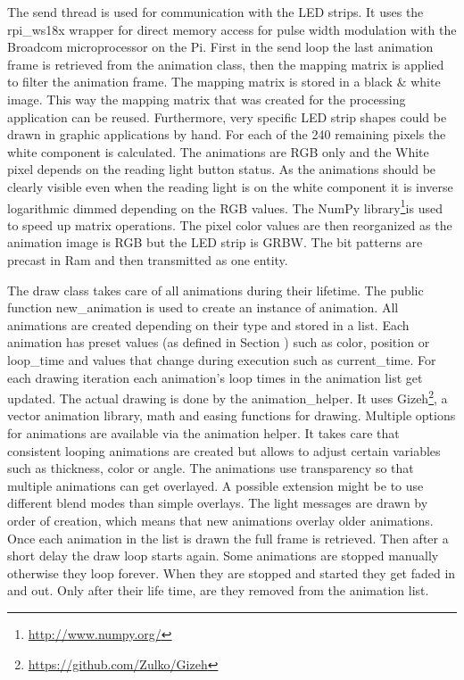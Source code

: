 The send thread is used for communication with the LED strips. It uses the rpi\_ws18x wrapper for direct memory access for pulse width modulation with the Broadcom microprocessor on the Pi. First in the send loop the last animation frame is retrieved from the animation class, then the mapping matrix is applied to filter the animation frame. The mapping matrix is stored in a black \& white image. This way the mapping matrix that was created for the processing application can be reused. Furthermore, very specific LED strip shapes could be drawn in graphic applications by hand. For each of the 240 remaining pixels the white component is calculated. The animations are RGB only and the White pixel depends on the reading light button status. As the animations should be clearly visible even when the reading light is on the white component it is inverse logarithmic dimmed depending on the RGB values. The NumPy library\footnote{\url{http://www.numpy.org/}}is used to speed up matrix operations. The pixel color values are then reorganized as the animation image is RGB but the LED strip is GRBW. The bit patterns are precast in Ram and then transmitted as one entity. 

The draw class takes care of all animations during their lifetime. The public function new\_animation is used to create an instance of animation. All animations are created depending on their type and stored in a list. Each animation has preset values (as defined in Section \emph{}) such as color, position or loop\_time and values that change during execution such as current\_time. For each drawing iteration each animation's loop times in the animation list get updated. The actual drawing is done by the animation\_helper. It uses Gizeh\footnote{\url{https://github.com/Zulko/Gizeh}}, a vector animation library, math and easing functions for drawing. Multiple options for animations are available via the animation helper. It takes care that consistent looping animations are created but allows to adjust certain variables such as thickness, color or angle. The animations use transparency so that multiple animations can get overlayed. A possible extension might be to use different blend modes than simple overlays. The light messages are drawn by order of creation, which means that new animations overlay older animations. Once each animation in the list is drawn the full frame is retrieved. Then after a short delay the draw loop starts again. Some animations are stopped manually otherwise they loop forever. When they are stopped and started they get faded in and out. Only after their life time, are they removed from the animation list. 
